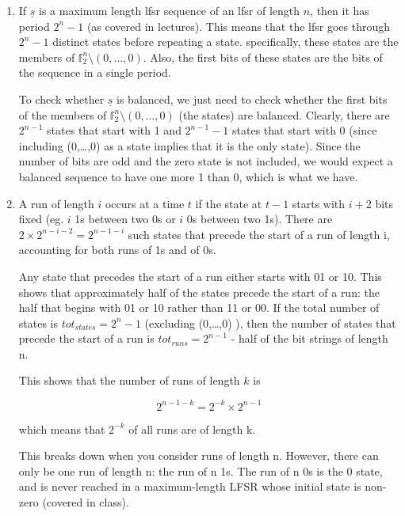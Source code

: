 \usepackage{amsfonts}

\begin{enumerate}

\item If $\underline{s}$ is a maximum length lfsr sequence of an lfsr of length
$n$, then it has period $2^n-1$ (as covered in lectures). This means that the
lfsr goes through $2^n-1$ distinct states before repeating a state.
specifically, these states are the members of $\mathbb{f}_2^n \setminus
(0,\dots,0)$. Also, the first bits of these states are the bits of the sequence
in a single period.

To check whether $\underline{s}$ is balanced, we just need to check whether the
first bits of the members of $\mathbb{f}_2^n \setminus (0,\dots,0)$ (the states)
are balanced. Clearly, there are $2^{n-1}$ states that start with 1 and
$2^{n-1}-1$ states that start with 0 (since including (0,\dots,0) as a state
implies that it is the only state). Since the number of bits are odd and the
zero state is not included, we would expect a balanced sequence to have one more
1 than 0, which is what we have.

\item A run of length $i$ occurs at a time $t$ if the state at $t-1$ starts with
$i+2$ bits fixed (eg. $i$ 1s between two 0s or $i$ 0s between two 1s). There are
$2 \times 2^{n-i-2} = 2^{n-1-i}$ such states that precede the start of a run of
length i, accounting for both runs of 1s and of 0s.

Any state that precedes the start of a run either starts with 01 or 10. This
shows that approximately half of the states precede the start of a run: the half
that begins with 01 or 10 rather than 11 or 00. If the total number of states is
$tot_{states} = 2^n-1$ (excluding (0,\dots,0) ), then the number of states that
precede the start of a run is $tot_{runs} = 2^{n-1}$ - half of the bit strings
of length n.

This shows that the number of runs of length $k$ is

\[2^{n-1-k} = 2^{-k} \times 2^{n-1}\]

which means that $2^{-k}$ of all runs are of length k.

This breaks down when you consider runs of length n. However, there can only be
one run of length n: the run of n 1s. The run of n 0s is the 0 state, and is
never reached in a maximum-length LFSR whose initial state is non-zero (covered
in class).

\end{enumerate}
